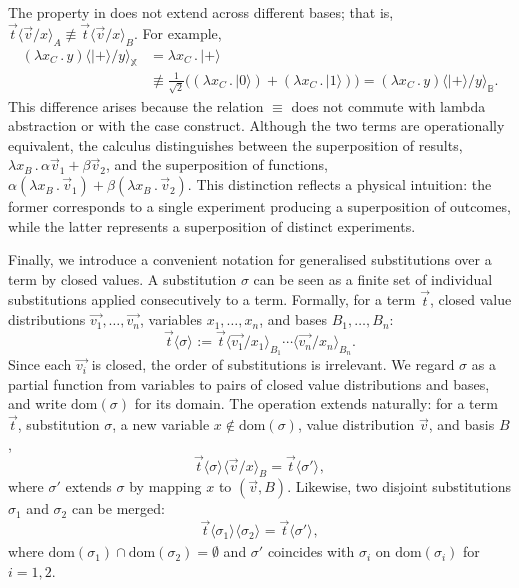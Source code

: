 \documentclass[runningheads,orivec,envcountsame,envcountsect]{llncs}
\newcommand\ket[1]{\ensuremath{|#1\rangle}}
\newcommand\ansubst[2]{\ensuremath{\langle #1 \rangle_{#2}}}
\newcommand\dom[1]{\mathrm{dom}(#1)}
\def\Lam#1#2#3{\lambda#1_{#2}\,{.}\,#3} %
\newcommand\B{\mathbb B}
\newcommand\XB{\mathbb X}
\begin{document}
\begin{remark}
  The property in  does not extend across
  different bases; that is,
  $\vec{t}\ansubst{\vec{v}/x}{A}\not\equiv\vec{t}\ansubst{\vec{v}/x}{B}$.
  For example,
  \begin{align*}
    (\Lam{x}{C}{y})\ansubst{\ket{+}/y}{\XB}
    &= \Lam{x}{C}{\ket{+}} \\
    &\not\equiv
       \tfrac{1}{\sqrt{2}}\big((\Lam{x}{C}{\ket{0}})
       + (\Lam{x}{C}{\ket{1}})\big)
       = (\Lam{x}{C}{y})\ansubst{\ket{+}/y}{\B}.
  \end{align*}
  This difference arises because the relation $\equiv$ does not commute with
  lambda abstraction or with the case construct. Although the two terms are
  operationally equivalent, the calculus distinguishes between the
  superposition of results,
  $\Lam{x}{B}{\alpha\vec v_1 + \beta\vec v_2}$,
  and the superposition of functions,
  $\alpha(\Lam{x}{B}{\vec v_1}) + \beta(\Lam{x}{B}{\vec v_2})$.
  This distinction reflects a physical intuition: the former corresponds to a
  single experiment producing a superposition of outcomes, while the latter
  represents a superposition of distinct experiments.
\end{remark}

Finally, we introduce a convenient notation for generalised substitutions over
a term by closed values. A substitution $\sigma$ can be seen as a finite set of
individual substitutions applied consecutively to a term. Formally, for a term
$\vec{t}$, closed value distributions $\vec{v_1},\dots,\vec{v_n}$, variables
$x_1,\dots,x_n$, and bases $B_1,\dots,B_n$:
\[
  \vec{t}\ansubst{\sigma}{}
  := \vec{t}\ansubst{\vec{v_1}/x_1}{B_1}\dotsb\ansubst{\vec{v_n}/x_n}{B_n}.
\]
Since each $\vec{v_i}$ is closed, the order of substitutions is irrelevant. We
regard $\sigma$ as a partial function from variables to pairs of closed value
distributions and bases, and write $\dom{\sigma}$ for its domain. The operation
extends naturally: for a term $\vec{t}$, substitution $\sigma$, a new variable
$x\notin\dom{\sigma}$, value distribution $\vec{v}$, and basis $B$,
\[
  \vec{t}\ansubst{\sigma}{}\ansubst{\vec{v}/x}{B}
  = \vec{t}\ansubst{\sigma'}{},
\]
where $\sigma'$ extends $\sigma$ by mapping $x$ to $(\vec v,B)$. Likewise, two
disjoint substitutions $\sigma_1$ and $\sigma_2$ can be merged:
\[
  \vec{t}\ansubst{\sigma_1}{}\ansubst{\sigma_2}{}
  = \vec{t}\ansubst{\sigma'}{},
\]
where $\dom{\sigma_1}\cap\dom{\sigma_2}=\emptyset$ and $\sigma'$ coincides with
$\sigma_i$ on $\dom{\sigma_i}$ for $i=1,2$.
\end{document}
